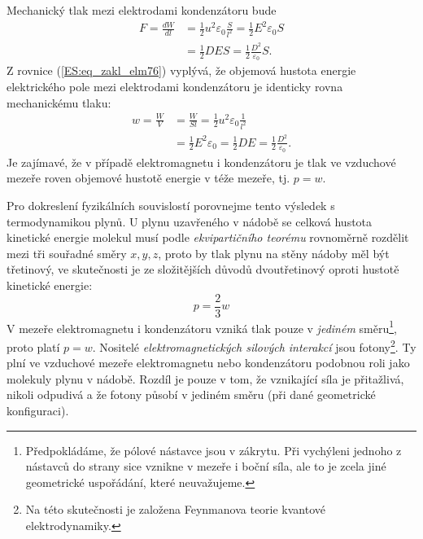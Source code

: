       Mechanický tlak mezi elektrodami kondenzátoru bude
      \begin{align}\label{ES:eq_zakl_elm78}
        F  = \frac{dW}{dl} 
          &= \frac{1}{2}u^2\varepsilon_0\frac{S}{l^2}
           = \frac{1}{2}E^2\varepsilon_0S                                 \nonumber \\
          &= \frac{1}{2}DES          
           = \frac{1}{2}\frac{D^2}{\varepsilon_0}S.
      \end{align}
      Z rovnice (\ref{ES:eq_zakl_elm76}) vyplývá, že objemová hustota energie elektrického pole 
      mezi elektrodami kondenzátoru je identicky rovna mechanickému tlaku:
      \begin{align}\label{ES:eq_zakl_elm79}
        w  = \frac{W}{V} 
          &= \frac{W}{Sl} 
           = \frac{1}{2}u^2\varepsilon_0\frac{1}{l^2}         \nonumber \\
          &= \frac{1}{2}E^2\varepsilon_0 = \frac{1}{2}DE 
           = \frac{1}{2}\frac{D^2}{\varepsilon_0}.
      \end{align}
      Je zajímavé, že v případě elektromagnetu i kondenzátoru je tlak ve vzduchové mezeře roven 
      objemové hustotě energie v téže mezeře, tj. \(p = w\).
      
      Pro dokreslení fyzikálních souvislostí porovnejme tento výsledek s termodynamikou plynů. U 
      plynu uzavřeného v nádobě se celková hustota kinetické energie molekul musí podle
      \emph{ekvipartičního teorému} rovnoměrně rozdělit mezi tři souřadné směry \(x, y, z\), proto 
      by tlak plynu na stěny nádoby měl být třetinový, ve skutečnosti je ze složitějších důvodů 
      dvoutřetinový oproti hustotě kinetické energie:
      \begin{equation}\label{ES:eq_zakl_elm80}
        p = \frac{2}{3}w
      \end{equation}
      V mezeře elektromagnetu i kondenzátoru vzniká tlak pouze v \emph{jediném} 
      směru\footnote{Předpokládáme, že pólové nástavce jsou v zákrytu. Při vychýleni jednoho z 
      nástavců do strany sice vznikne v mezeře i boční síla, ale to je zcela jiné geometrické 
      uspořádání, které neuvažujeme.}, proto platí \(p = w\). Nositelé \emph{elektromagnetických 
      silových interakcí} jsou fotony\footnote{Na této skutečnosti je založena Feynmanova teorie 
      kvantové elektrodynamiky.}. Ty plní ve vzduchové mezeře elektromagnetu nebo 
      kondenzátoru podobnou roli jako molekuly plynu v nádobě. Rozdíl je pouze v tom, že vznikající 
      síla je přitažlivá, nikoli odpudivá a že fotony působí v jediném směru (při dané geometrické 
      konfiguraci).
      
